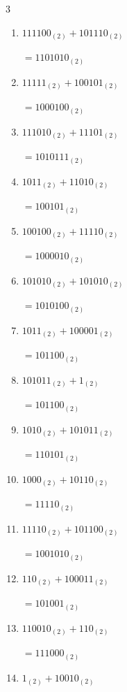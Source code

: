 \begin{multicols}{3}
\begin{enumerate}
        $=110011_{(2)}$

  \item $111100_{(2)} + 101110_{(2)}$

        $=1101010_{(2)}$

  \item $11111_{(2)} + 100101_{(2)}$

        $=1000100_{(2)}$

  \item $111010_{(2)} + 11101_{(2)}$

        $=1010111_{(2)}$

  \item $1011_{(2)} + 11010_{(2)}$

        $=100101_{(2)}$

  \item $100100_{(2)} + 11110_{(2)}$

        $=1000010_{(2)}$

  \item $101010_{(2)} + 101010_{(2)}$

        $=1010100_{(2)}$

\columnbreak %

  \item $1011_{(2)} + 100001_{(2)}$

        $=101100_{(2)}$

  \item $101011_{(2)} + 1_{(2)}$

        $=101100_{(2)}$

  \item $1010_{(2)} + 101011_{(2)}$

        $=110101_{(2)}$

  \item $1000_{(2)} + 10110_{(2)}$

        $=11110_{(2)}$

  \item $11110_{(2)} + 101100_{(2)}$

        $=1001010_{(2)}$

  \item $110_{(2)} + 100011_{(2)}$

        $=101001_{(2)}$

  \item $110010_{(2)} + 110_{(2)}$

        $=111000_{(2)}$

  \item $1_{(2)} + 10010_{(2)}$


\end{enumerate}
\end{multicols}
